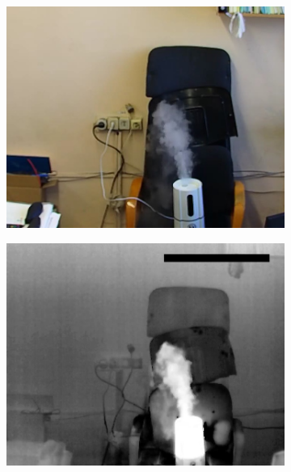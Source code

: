 \documentclass[14pt, a4paper]{extreport}
\begin{document}
\begin{figure}[h!]
\begin{subfigure}{.32\textwidth}
			\includegraphics[width = \textwidth]{image/chapter_3/examples/img/240}
			\caption{}
		\end{subfigure}
		\hspace{0.1cm}
		\begin{subfigure}{.32\textwidth}
			\centering
			\includegraphics[width = \textwidth]{image/chapter_3/examples/tep/240}
			\caption{}
		\end{subfigure}
		\hspace{0.1cm}
		\begin{subfigure}{.32\textwidth}
			\centering

\end{subfigure}
\end{figure}
\end{document}
